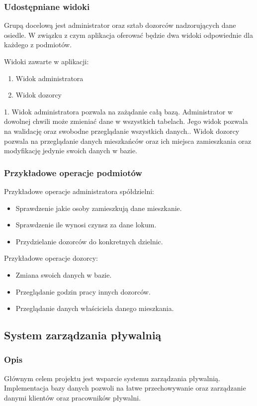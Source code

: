 \documentclass{article}
\begin{document}
\subsubsection{Udostępniane widoki}
Grupą docelową jest administrator oraz sztab dozorców nadzorujących dane osiedle. W związku z czym aplikacja oferować będzie dwa widoki odpowiednie dla każdego z podmiotów.

\pagebreak{}

Widoki zawarte w aplikacji:
\begin{enumerate}
    \item Widok administratora
    \item Widok dozorcy
\end{enumerate}
1. Widok administratora pozwala na zażądanie całą bazą. Administrator w dowolnej chwili może zmieniać dane w wszystkich tabelach. Jego widok pozwala na walidację oraz swobodne przeglądanie wszystkich danych.. Widok dozorcy pozwala na przeglądanie danych mieszkańców oraz ich miejsca zamieszkania oraz modyfikację jedynie swoich danych w bazie.

\subsubsection{Przykładowe operacje podmiotów}
Przykładowe operacje administratora spółdzielni:
\begin{itemize}
    \item Sprawdzenie jakie osoby zamieszkują dane mieszkanie.
    \item Sprawdzenie ile wynosi czynsz za dane lokum.
    \item Przydzielanie dozorców do konkretnych dzielnic.
\end{itemize}
Przykładowe operacje dozorcy:
\begin{itemize}
    \item Zmiana swoich danych w bazie.
    \item Przeglądanie godzin pracy innych dozorców.
    \item Przeglądanie danych właściciela danego mieszkania.
\end{itemize}

\subsection{System zarządzania pływalnią}

\subsubsection{Opis}
Głównym celem projektu jest wsparcie systemu zarządzania pływalnią. Implementacja bazy danych pozwoli na łatwe przechowywanie oraz zarządzanie danymi klientów oraz pracowników pływalni. 
\end{document}
